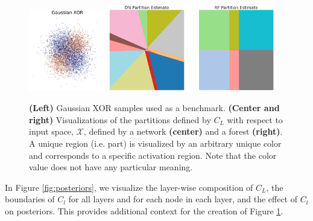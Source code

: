 \begin{figure}[htb]
\centering
\includegraphics[width=0.3\textwidth]{figures/gaussian_xor}
\includegraphics[width=0.65\textwidth]{figures/partition_estimate.png}
  \caption{\textbf{(Left)} Gaussian XOR samples used as a benchmark. 
  \textbf{(Center and right)} Visualizations of the partitions defined by $C_L$ with respect to input space, $\mathcal{X}$, defined by a network \textbf{(center)} and a forest \textbf{(right)}. 
  A unique region (i.e. part) is visualized by an arbitrary unique color and corresponds to a specific activation region.
  Note that the color value does not have any particular meaning. 
  }
\label{fig:xor}
\end{figure}

In Figure \ref{fig:posteriors}, we visualize the layer-wise composition of $C_L$, the boundaries of $C_l$ for all layers and for each node in each layer, and the effect of $C_l$ on posteriors. This provides additional context for the creation of Figure \ref{fig:xor}.


